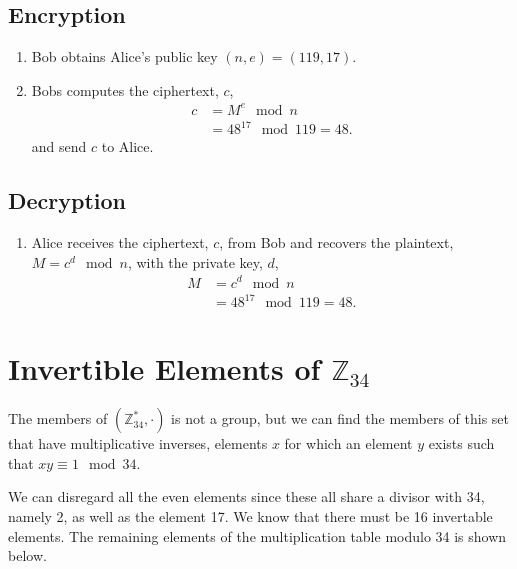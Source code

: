\documentclass[11pt]{article} %
\begin{document}
\subsection{Encryption}
\begin{enumerate}
	\item Bob obtains Alice's public key $(n,e) = (119,17)$.
	\item Bobs computes the ciphertext, $c$,
		\begin{align*}
			c &= M^e \mod n \\
			  &= 48^{17} \mod 119 = 48.
		\end{align*}
		and send $c$ to Alice.
\end{enumerate}

\subsection{Decryption}
\begin{enumerate}
	\item Alice receives the ciphertext, $c$, from Bob and recovers the
		plaintext, $M = c^d \mod n$, with the private key, $d$,
		\begin{align*}
			M &= c^d \mod n \\
			  &= 48^{17} \mod 119 = 48.
		\end{align*}
\end{enumerate}

\section{Invertible Elements of $\mathbb{Z}_{34}$}
The members of $\left(\mathbb{Z}_{34}^*, \cdot\right)$ is not a group, but we
can find the members of this set that have multiplicative inverses, elements $x$
for which an element $y$ exists such that $xy \equiv 1\mod 34$.

We can disregard all the even elements since these all share a divisor with 34,
namely 2, as well as the element 17. We know that there must be 16 invertable
elements. The remaining elements of the multiplication table modulo 34 is shown
below.


\end{document}
